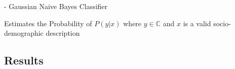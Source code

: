 - Gaussian Naive Bayes Classifier

Estimates the Probability of $P(y | x)$ where $y \in \mathbb{C}$ and $x$ is a valid socio-demographic
description %



\subsection{Results}
\label{sub_sec:ClassifierResults}






